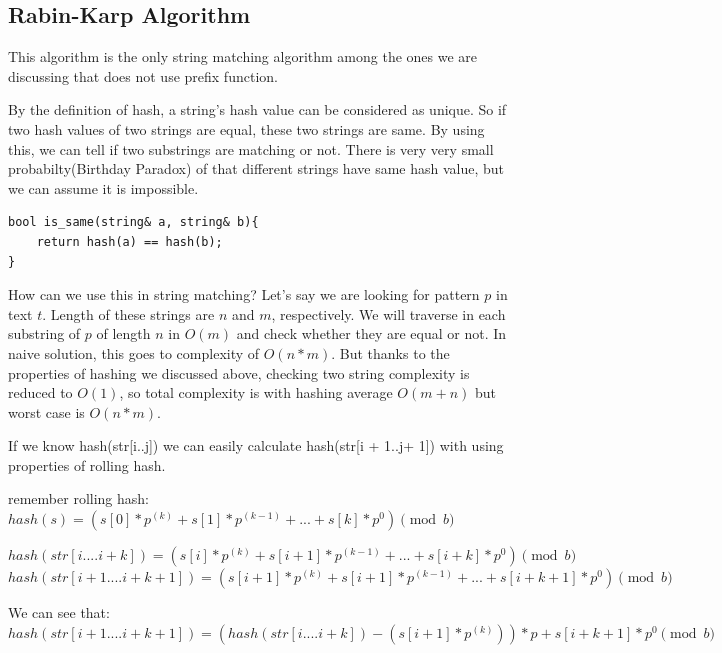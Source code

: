 \documentclass[12pt]{article}
\begin{document}
        \subsection{Rabin-Karp Algorithm}
        This algorithm is the only string matching algorithm among the ones we are discussing that does not use prefix function.
        
        By the definition of hash, a string's hash value can be considered as unique. So if two hash values of two strings are equal, these two strings are same. By using this, we can tell if two substrings are matching or not. There is very very small probabilty(Birthday Paradox\cite{birth}) of that different strings have same hash value, but we can assume it is impossible. 
        
        \begin{verbatim}
bool is_same(string& a, string& b){
    return hash(a) == hash(b);
}
        \end{verbatim}
        How can we use this in string matching? Let's say we are looking for pattern $p$ in text $t$. Length of these strings are $n$ and $m$, respectively. We will traverse in each substring of $p$ of length $n$ in $O(m)$ and check whether they are equal or not. In naive solution, this goes to complexity of $O(n*m)$. But thanks to the properties of hashing we discussed above, checking two string complexity is reduced to $O(1)$, so total complexity is with hashing average $O(m+n)$ but worst case is $O(n*m)$\cite{rabin}.
        

        
        If we know hash(str[i..j]) we can easily calculate hash(str[i + 1..j+ 1]) with using properties of rolling hash.
        
        remember rolling hash: $hash(s) = (s[0] * p^{(k)}+ s[1] * p ^ {(k-1)} + ... + s[k] * p^0) \pmod{b}$
        
        $hash(str[i....i+k]) = (s[i] * p^{(k)}+ s[i+1] * p ^ {(k-1)} + ... + s[i + k] * p^0) \pmod{b}$\newline
        $hash(str[i+1....i+k+1]) = (s[i+1] * p^{(k)}+ s[i+1] * p ^ {(k-1)} + ... + s[i + k + 1] * p^0) \pmod{b}$
        
        We can see that: \newline$hash(str[i+1....i+k+1]) = (hash(str[i....i+k]) - (s[i+1] * p^{(k)}))*p + s[i + k + 1] * p^0 \pmod{b}$
        
\end{document}
